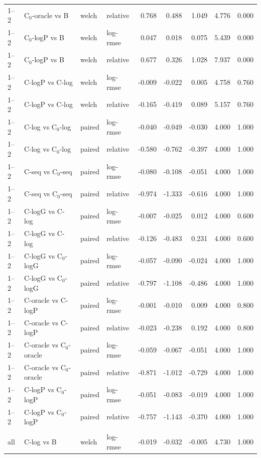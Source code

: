 \begin{longtable}{llllrrrrr}
1–2 & C$_0$-oracle vs B & welch & relative & 0.768 & 0.488 & 1.049 & 4.776 & 0.000 \\
1–2 & C$_0$-logP vs B & welch & log-rmse & 0.047 & 0.018 & 0.075 & 5.439 & 0.000 \\
1–2 & C$_0$-logP vs B & welch & relative & 0.677 & 0.326 & 1.028 & 7.937 & 0.000 \\
1–2 & C-logP vs C-log & welch & log-rmse & -0.009 & -0.022 & 0.005 & 4.758 & 0.760 \\
1–2 & C-logP vs C-log & welch & relative & -0.165 & -0.419 & 0.089 & 5.157 & 0.760 \\
1–2 & C-log vs C$_0$-log & paired & log-rmse & -0.040 & -0.049 & -0.030 & 4.000 & 1.000 \\
1–2 & C-log vs C$_0$-log & paired & relative & -0.580 & -0.762 & -0.397 & 4.000 & 1.000 \\
1–2 & C-seq vs C$_0$-seq & paired & log-rmse & -0.080 & -0.108 & -0.051 & 4.000 & 1.000 \\
1–2 & C-seq vs C$_0$-seq & paired & relative & -0.974 & -1.333 & -0.616 & 4.000 & 1.000 \\
1–2 & C-logG vs C-log & paired & log-rmse & -0.007 & -0.025 & 0.012 & 4.000 & 0.600 \\
1–2 & C-logG vs C-log & paired & relative & -0.126 & -0.483 & 0.231 & 4.000 & 0.600 \\
1–2 & C-logG vs C$_0$-logG & paired & log-rmse & -0.057 & -0.090 & -0.024 & 4.000 & 1.000 \\
1–2 & C-logG vs C$_0$-logG & paired & relative & -0.797 & -1.108 & -0.486 & 4.000 & 1.000 \\
1–2 & C-oracle vs C-logP & paired & log-rmse & -0.001 & -0.010 & 0.009 & 4.000 & 0.800 \\
1–2 & C-oracle vs C-logP & paired & relative & -0.023 & -0.238 & 0.192 & 4.000 & 0.800 \\
1–2 & C-oracle vs C$_0$-oracle & paired & log-rmse & -0.059 & -0.067 & -0.051 & 4.000 & 1.000 \\
1–2 & C-oracle vs C$_0$-oracle & paired & relative & -0.871 & -1.012 & -0.729 & 4.000 & 1.000 \\
1–2 & C-logP vs C$_0$-logP & paired & log-rmse & -0.051 & -0.083 & -0.019 & 4.000 & 1.000 \\
1–2 & C-logP vs C$_0$-logP & paired & relative & -0.757 & -1.143 & -0.370 & 4.000 & 1.000 \\
\addlinespace
\multicolumn{9}{l}{\textit{RF}} \\
all & C-log vs B & welch & log-rmse & -0.019 & -0.032 & -0.005 & 4.730 & 1.000 \\

\end{longtable}
